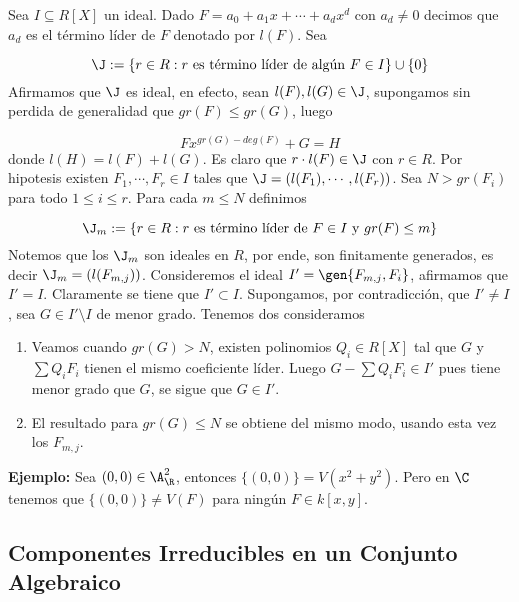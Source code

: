 \documentclass{article}
\begin{document}
\begin{dem}
    Sea $I\subseteq R[X]$ un ideal. Dado $F=a_{0}+a_{1}x+\cdots+a_{d}x^{d}$ con $a_{d}\neq0$
    decimos que $a_{d}$ es el término líder de $F$ denotado por $l(F)$. Sea
    
    \begin{equation*}
        \J:=\{r\in R:r \text{ es término líder de algún } F\in I\}\cup\{0\}
    \end{equation*}
    Afirmamos que $\J$ es ideal, en efecto, sean $l(F),l(G)\in\J$, supongamos sin perdida de 
    generalidad que $gr(F)\leq gr(G)$, luego
    
    \begin{equation*}
        Fx^{gr(G)-deg(F)}+G=H
    \end{equation*}
    donde $l(H)=l(F)+l(G)$. Es claro que $r\cdot l(F)\in\J$ con $r\in R$. Por hipotesis existen 
    $F_{1},\cdots,F_{r}\in I$ tales que $\J=(l(F_{1}),\cdots,l(F_{r}))$. Sea $N>gr(F_{i})$ para
    todo $1\leq i\leq r$. Para cada $m\leq N$ definimos

    \begin{equation*}
        \J_{m}:=\{r\in R:r\text{ es término líder de }F\in I\text{ y }gr(F)\leq m\}
    \end{equation*}
    Notemos que los $\J_{m}$ son ideales en $R$, por ende, son finitamente generados, es decir
    $\J_{m}=(l(F_{m,j}))$. Consideremos el ideal $I'=\gen{F_{m,j}, F_{i}}$, afirmamos que $I'=I$.
    Claramente se tiene que $I'\subset I$. Supongamos, por contradicción, que $I'\neq I$, sea 
    $G\in I'\setminus I$ de menor grado. Tenemos dos consideramos

    \begin{enumerate}
        \item Veamos cuando $gr(G)>N$, existen polinomios $Q_{i}\in R[X]$ tal que $G$ y 
        $\sum Q_{i}F_{i}$ tienen el mismo coeficiente líder. Luego $G-\sum Q_{i}F_{i}\in I'$ pues
        tiene menor grado que $G$, se sigue que $G\in I'$.

        \item El resultado para $gr(G)\leq N$ se obtiene del mismo modo, usando esta vez los 
        $F_{m,j}$.
    \end{enumerate}
\end{dem}

\noindent\textbf{Ejemplo:} Sea $(0,0)\in\A_{\R}^{2}$, entonces $\{(0,0)\}=V(x^{2}+y^{2})$. Pero en
$\C$ tenemos que $\{(0,0)\}\neq V(F)$ para ningún $F\in k[x,y]$.

\subsection{Componentes Irreducibles en un Conjunto Algebraico}
\end{document}
